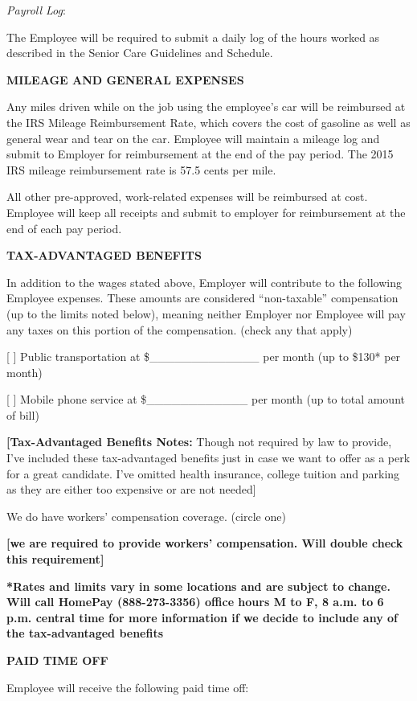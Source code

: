 \documentclass[]{article}
\begin{document}
\emph{Payroll Log}:

The Employee will be required to submit a daily log of the hours worked
as described in the Senior Care Guidelines and Schedule.

\textbf{MILEAGE AND GENERAL EXPENSES}

Any miles driven while on the job using the employee's car will be
reimbursed at the IRS Mileage Reimbursement Rate, which covers the cost
of gasoline as well as general wear and tear on the car. Employee will
maintain a mileage log and submit to Employer for reimbursement at the
end of the pay period. The 2015 IRS mileage reimbursement rate is 57.5
cents per mile.

All other pre-approved, work-related expenses will be reimbursed at
cost. Employee will keep all receipts and submit to employer for
reimbursement at the end of each pay period.

\textbf{TAX-ADVANTAGED BENEFITS}

In addition to the wages stated above, Employer will contribute to the
following Employee expenses. These amounts are considered
``non-taxable'' compensation (up to the limits noted below), meaning
neither Employer nor Employee will pay any taxes on this portion of the
compensation. (check any that apply)

[ ] Public transportation at \$\_\_\_\_\_\_\_\_\_\_\_\_\_ per month (up to
\$130* per month)

[ ] Mobile phone service at \$\_\_\_\_\_\_\_\_\_\_\_\_ per month (up to
total amount of bill)

\textbf{{[}Tax-Advantaged Benefits Notes:} Though not required by law to
provide, I've included these tax-advantaged benefits just in case we
want to offer as a perk for a great candidate. I've omitted health
insurance, college tuition and parking as they are either too expensive
or are not needed{]}

We do have workers' compensation coverage. (circle one)

\textbf{{[}we are required to provide workers' compensation. Will double
check this requirement{]}}

\textbf{*Rates and limits vary in some locations and are subject to
change. Will call HomePay (888-273-3356) office hours M to F, 8 a.m. to
6 p.m. central time for more information if we decide to include any of
the tax-advantaged benefits}

\textbf{PAID TIME OFF}

Employee will receive the following paid time off:
\end{document}
